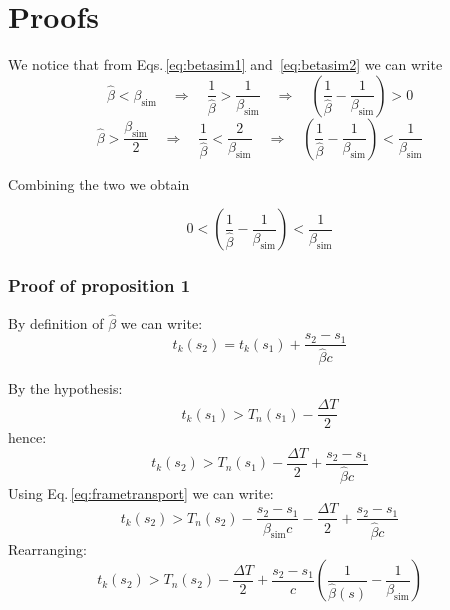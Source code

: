 \section{Proofs}
\label{seq:coasting_proofs}


We notice that from Eqs.\,\ref{eq:betasim1} and~\ref{eq:betasim2} we can write
\begin{equation}
\hat{\beta} < \beta_\text{sim}
\quad \Rightarrow \quad
\frac{1}{\hat{\beta}} > \frac{1}{\beta_\text{sim}}
\quad \Rightarrow \quad
\left(
\frac{1}{\hat{\beta}} - \frac{1}{\beta_\text{sim}}
\right) > 0
\end{equation}
\begin{equation}
\hat{\beta} > \frac{\beta_\text{sim}}{2}
\quad \Rightarrow \quad
\frac{1}{\hat{\beta}} < \frac{2}{\beta_\text{sim}}
\quad \Rightarrow \quad
\left(
\frac{1}{\hat{\beta}} - \frac{1}{\beta_\text{sim}}
\right) < \frac{1}{\beta_\text{sim}}
\end{equation}

Combining the two we obtain

\begin{equation}
0<\left(
\frac{1}{\hat{\beta}} - \frac{1}{\beta_\text{sim}}
\right) < \frac{1}{\beta_\text{sim}}
\label{eq:betaineq}
\end{equation}

\subsubsection*{Proof of proposition 1}
By definition of $\hat{\beta}$ we can write:
\begin{equation}
t_k(s_2) = t_k(s_1) + \frac{s_2 - s_1}{\hat{\beta} c}
\label{eq:tk2fromtk1}
\end{equation}

By the hypothesis:
\begin{equation}
t_k(s_1) > T_n(s_1) - \frac{\Delta T}{2}
\end{equation}
hence:
\begin{equation}
t_k(s_2) > T_n(s_1) - \frac{\Delta T}{2} + \frac{s_2 - s_1}{\hat{\beta} c}
\end{equation}
Using Eq.\,\ref{eq:frametransport} we can write:
\begin{equation}
t_k(s_2) > T_n(s_2) - \frac{s_2 - s_1}{{\beta}_\text{sim} c}  - \frac{\Delta T}{2} + \frac{s_2 - s_1}{\hat{\beta} c}
\end{equation}
Rearranging:
\begin{equation}
t_k(s_2) > T_n(s_2) - \frac{\Delta T}{2} + \frac{s_2 - s_1}{c} \left(
\frac{1}{\hat{\beta}(s)} - \frac{1}{\beta_\text{sim}}
\right)
\end{equation}

